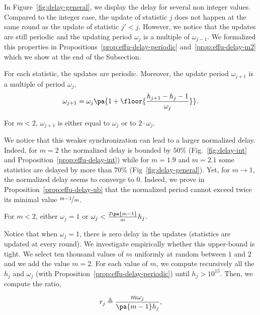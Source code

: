 In Figure~\ref{fig:delay-general}, we display the delay for several non integer values. Compared to the integer case, the update of statistic $j$ does not happen at the same round as the update of statistic $j'<j$. However, we notice that the updates are still periodic and the updating period $\omega_j$ is a multiple of $\omega_{j-1}$. We formalized this properties in Propositions~\ref{prop:effu-delay-periodic} and~\ref{prop:effu-delay-m2} which we show at the end of the Subsection. 

\begin{proposition}
\label{prop:effu-delay-periodic}
For each statistic, the updates are periodic. Moreover, the update period $\omega_{j+1}$ is a multiple of period $\omega_j$,
\[
\omega_{j+1} = \omega_j \pa{1 + \floor{\frac{h_{j+1} - h_{j} -1}{\omega_j}}}.
\]
\end{proposition}

\begin{proposition}
\label{prop:effu-delay-m2}
For $m<2$, $\omega_{j+1}$ is either equal to $\omega_j$ or to $2\cdot \omega_j$. 
\end{proposition}

We notice that this weaker synchronization can lead to a larger normalized delay. Indeed, for $m=2$ the normalized delay is bounded by $50\%$ (Fig.~\ref{fig:delay-int} and Proposition~\ref{prop:effu-delay-int}) while for $m=1.9$ and $m=2.1$ some statistics are delayed by more than $70\%$ (Fig~\ref{fig:delay-general}). Yet, for $m \rightarrow 1$, the normalized delay seems to converge to $0$. Indeed, we prove in Proposition~\ref{prop:effu-delay-ub} that the normalized period cannot exceed twice its minimal value $\nicefrac{m-1}{m}$.

\begin{proposition}
\label{prop:effu-delay-ub}
For $m<2$, either $\omega_j = 1$ or $\omega_j < \frac{2\pa{m-1}}{m} h_j$.
\end{proposition}

Notice that when $\omega_j=1$, there is zero delay in the updates (statistics are updated at every round). We investigate empirically whether this upper-bound is tight. We select ten thousand values of $m$ uniformly at random between $1$ and $2$ and we add the value $m=2$. For each value of $m$, we compute recursively all the $h_j$ and $\omega_j$ (with Proposition~\ref{prop:effu-delay-periodic}) until $h_j > 10^{15}$. Then, we compute the ratio,

 \[r_j \triangleq \frac{m \omega_j}{\pa{m-1}h_j},\] 

